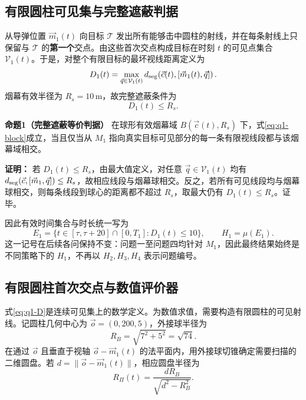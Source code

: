 \subsection{有限圆柱可见集与完整遮蔽判据}
从导弹位置 $\vec m_1(t)$ 向目标 $\mathcal T$ 发出所有能够击中圆柱的射线，并在每条射线上只保留与 $\mathcal T$ 的\textbf{第一个}交点。由这些首次交点构成目标在时刻 $t$ 的可见点集合 $\mathcal V_1(t)$。于是，对整个有限目标的最坏视线距离定义为
\begin{equation}
D_1(t)=
\max_{\vec q\in\mathcal V_1(t)}
 d_{\rm seg}\!\left(
 \vec c(t),[\vec m_1(t),\vec q]
 \right).
\label{eq:q1-D}
\end{equation}
烟幕有效半径为 $R_s=10\,\mathrm m$，故完整遮蔽条件为
\begin{equation}
D_1(t)\le R_s.
\label{eq:q1-block}
\end{equation}

\begin{propositionbox}
\textbf{命题1（完整遮蔽等价判据）}\quad
在球形有效烟幕域 $B(\vec c(t),R_s)$ 下，式\eqref{eq:q1-block}成立，当且仅当从 $M_1$ 指向真实目标可见部分的每一条有限视线段都与该烟幕域相交。

\textbf{证明：}
若 $D_1(t)\le R_s$，由最大值定义，对任意 $\vec q\in\mathcal V_1(t)$ 均有
$d_{\rm seg}(\vec c,[\vec m_1,\vec q])\le R_s$，故相应线段与烟幕球相交。反之，若所有可见线段均与烟幕球相交，则每条线段到球心的距离都不超过 $R_s$，取最大仍有 $D_1(t)\le R_s$。证毕。\proofend
\end{propositionbox}

因此有效时间集合与时长统一写为
\begin{equation}
E_1=\{t\in[\tau,\tau+20]\cap[0,T_1]:D_1(t)\le10\},
\qquad
H_1=\mu(E_1).
\label{eq:q1-set}
\end{equation}
这一记号在后续各问保持不变：问题一至问题四均针对 $M_1$，因此最终结果始终是不同策略下的 $H_1$，不再以 $H_2,H_3,H_4$ 表示问题编号。

\subsection{有限圆柱首次交点与数值评价器}
式\eqref{eq:q1-D}是连续可见集上的数学定义。为数值求值，需要构造有限圆柱的可见射线。记圆柱几何中心为 $\vec o=(0,200,5)$，外接球半径为
\[
R_B=\sqrt{7^2+5^2}=\sqrt{74}.
\]
在通过 $\vec o$ 且垂直于视轴 $\vec o-\vec m_1(t)$ 的法平面内，用外接球切锥确定需要扫描的二维圆盘。若 $d=\lVert\vec o-\vec m_1(t)\rVert$，相应圆盘半径为
\begin{equation}
R_{\Pi}(t)=\frac{dR_B}{\sqrt{d^2-R_B^2}}.
\label{eq:plane-radius}
\end{equation}


